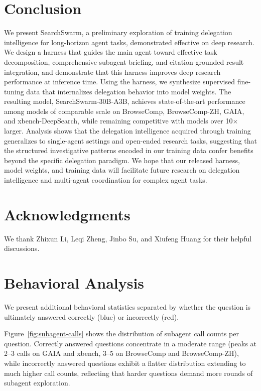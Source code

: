 \documentclass[table]{gtech}
\begin{document}
\section{Conclusion}
\label{sec:conclusion}

We present SearchSwarm, a preliminary exploration of training delegation intelligence for long-horizon agent tasks, demonstrated effective on deep research. We design a harness that guides the main agent toward effective task decomposition, comprehensive subagent briefing, and citation-grounded result integration, and demonstrate that this harness improves deep research performance at inference time. Using the harness, we synthesize supervised fine-tuning data that internalizes delegation behavior into model weights. The resulting model, SearchSwarm-30B-A3B, achieves state-of-the-art performance among models of comparable scale on BrowseComp, BrowseComp-ZH, GAIA, and xbench-DeepSearch, while remaining competitive with models over 10$\times$ larger. Analysis shows that the delegation intelligence acquired through training generalizes to single-agent settings and open-ended research tasks, suggesting that the structured investigative patterns encoded in our training data confer benefits beyond the specific delegation paradigm. We hope that our released harness, model weights, and training data will facilitate future research on delegation intelligence and multi-agent coordination for complex agent tasks.

\section*{Acknowledgments}
We thank Zhixun Li, Leqi Zheng, Jinbo Su, and Xiufeng Huang for their helpful discussions.





\clearpage
\appendix
\section{Behavioral Analysis}
\label{sec:appendix-behavior}

We present additional behavioral statistics separated by whether the question is ultimately answered correctly (blue) or incorrectly (red).

Figure~\ref{fig:subagent-calls} shows the distribution of subagent call counts per question. Correctly answered questions concentrate in a moderate range (peaks at 2--3 calls on GAIA and xbench, 3--5 on BrowseComp and BrowseComp-ZH), while incorrectly answered questions exhibit a flatter distribution extending to much higher call counts, reflecting that harder questions demand more rounds of subagent exploration.
\end{document}
